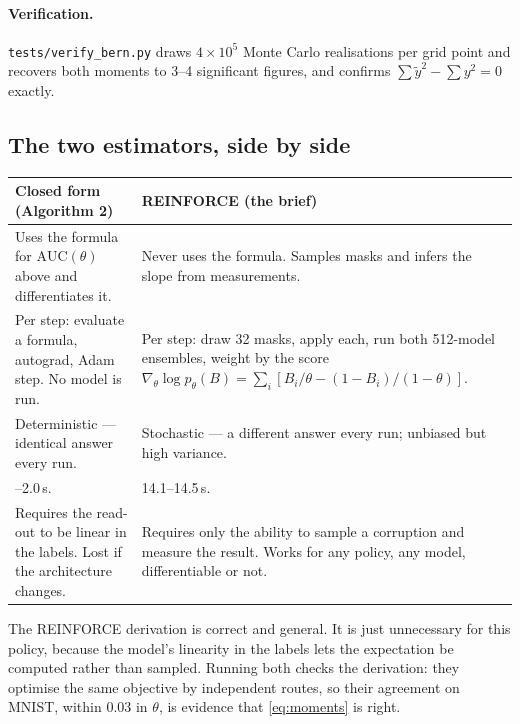 \documentclass[11pt,a4paper]{article}
\begin{document}
\paragraph{Verification.} \texttt{tests/verify\_bern.py} draws $4\times10^5$
Monte Carlo realisations per grid point and recovers both moments to 3--4
significant figures, and confirms $\sum\tilde y^2 - \sum y^2 = 0$ exactly.

\subsection*{The two estimators, side by side}

\begin{center}\small
\begin{tabular}{p{}p{}}
\toprule
\textbf{Closed form (Algorithm 2)} & \textbf{REINFORCE (the brief)}\\
\midrule
Uses the formula for $\mathrm{AUC}(\theta)$ above and differentiates it.
& Never uses the formula. Samples masks and infers the slope from
measurements.\\
\addlinespace
Per step: evaluate a formula, autograd, Adam step. No model is run.
& Per step: draw 32 masks, apply each, run both 512-model ensembles, weight by
the score $\nabla_\theta\log p_\theta(B) = \sum_i[B_i/\theta - (1-B_i)/(1-\theta)]$.\\
\addlinespace
Deterministic --- identical answer every run.
& Stochastic --- a different answer every run; unbiased but high variance.\\
\addlinespace
1.7--2.0\,s.
& 14.1--14.5\,s.\\
\addlinespace
Requires the read-out to be linear in the labels. Lost if the architecture
changes.
& Requires only the ability to sample a corruption and measure the result.
Works for any policy, any model, differentiable or not.\\
\bottomrule
\end{tabular}
\end{center}

The REINFORCE derivation is correct and general. It is just unnecessary for
this policy, because the model's linearity in the labels lets the expectation
be computed rather than sampled. Running both checks the derivation: they
optimise the same objective by independent routes, so their agreement on MNIST,
within $0.03$ in $\theta$, is evidence that \eqref{eq:moments} is right.

\clearpage
\end{document}
